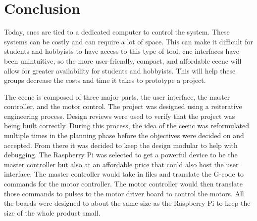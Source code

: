 \chapter{Conclusion}

Today, \gls{cnc}s are tied to a dedicated computer to control the system.
These systems can be costly and can require a lot of space.
This can make it difficult for students and hobbyists to have access to this type of tool.
\gls{cnc} interfaces have been unintuitive, so the more user-friendly, compact, and affordable \gls{ceenc} will allow for greater availability for students and hobbyists.
This will help these groups decrease the costs and time it takes to prototype a project.

The \gls{ceenc} is composed of three major parts, the user interface, the master controller, and the motor control.
The project was designed using a reiterative engineering process.
Design reviews were used to verify that the project was being built correctly.
During this process, the idea of the \gls{ceenc} was reformulated multiple times in the planning phase before the objectives were decided on and accepted.
From there it was decided to keep the design modular to help with debugging.
The Raspberry Pi was selected to get a powerful device to be the master controller but also at an affordable price that could also host the user interface.
The master controller would take in files and translate the G-code to commands for the motor controller.
The motor controller would then translate those commands to pulses to the motor driver board to control the motors.
All the boards were designed to about the same size as the Raspberry Pi to keep the size of the whole product small.


